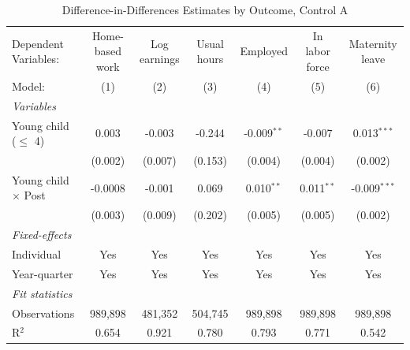 
\begin{table}[H]
   \caption{\label{tab:did_outcomes_A} Difference-in-Differences Estimates by Outcome, Control A}
   \centering
\footnotesize\setlength{\tabcolsep}{3pt}
   \begin{tabular}{lcccccc}
      \toprule
      Dependent Variables:       & Home-based work & Log earnings & Usual hours & Employed      & In labor force & Maternity leave\\  
      Model:                     & (1)             & (2)          & (3)         & (4)           & (5)            & (6)\\  
      \midrule
      \emph{Variables}\\
      Young child ($\leq$ 4)     & 0.003           & -0.003       & -0.244      & -0.009$^{**}$ & -0.007         & 0.013$^{***}$\\   
                                 & (0.002)         & (0.007)      & (0.153)     & (0.004)       & (0.004)        & (0.002)\\   
\addlinespace[2pt]
      Young child $\times$ Post  & -0.0008         & -0.001       & 0.069       & 0.010$^{**}$  & 0.011$^{**}$   & -0.009$^{***}$\\   
                                 & (0.003)         & (0.009)      & (0.202)     & (0.005)       & (0.005)        & (0.002)\\   
\addlinespace[2pt]
      \midrule
      \emph{Fixed-effects}\\
      Individual                 & Yes             & Yes          & Yes         & Yes           & Yes            & Yes\\  
      Year-quarter               & Yes             & Yes          & Yes         & Yes           & Yes            & Yes\\  
      \midrule
      \emph{Fit statistics}\\
      Observations               & 989,898         & 481,352      & 504,745     & 989,898       & 989,898        & 989,898\\  
      R$^2$                      & 0.654           & 0.921        & 0.780       & 0.793         & 0.771          & 0.542\\  
\bottomrule
   \end{tabular}
   

\end{table}
